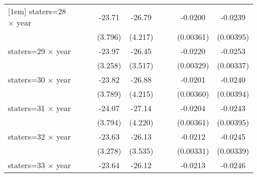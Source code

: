 {\begin{longtable}{l*{8}{c}}
[1em]
staters=28 $\times$ year&                     &                     &      -23.71\sym{***}&      -26.79\sym{***}&                     &                     &     -0.0200\sym{***}&     -0.0239\sym{***}\\
                    &                     &                     &     (3.796)         &     (4.217)         &                     &                     &   (0.00361)         &   (0.00395)         \\
[1em]
staters=29 $\times$ year&                     &                     &      -23.97\sym{***}&      -26.45\sym{***}&                     &                     &     -0.0220\sym{***}&     -0.0253\sym{***}\\
                    &                     &                     &     (3.258)         &     (3.517)         &                     &                     &   (0.00329)         &   (0.00337)         \\
[1em]
staters=30 $\times$ year&                     &                     &      -23.82\sym{***}&      -26.88\sym{***}&                     &                     &     -0.0201\sym{***}&     -0.0240\sym{***}\\
                    &                     &                     &     (3.789)         &     (4.215)         &                     &                     &   (0.00360)         &   (0.00394)         \\
[1em]
staters=31 $\times$ year&                     &                     &      -24.07\sym{***}&      -27.14\sym{***}&                     &                     &     -0.0204\sym{***}&     -0.0243\sym{***}\\
                    &                     &                     &     (3.794)         &     (4.220)         &                     &                     &   (0.00361)         &   (0.00395)         \\
[1em]
staters=32 $\times$ year&                     &                     &      -23.63\sym{***}&      -26.13\sym{***}&                     &                     &     -0.0212\sym{***}&     -0.0245\sym{***}\\
                    &                     &                     &     (3.278)         &     (3.535)         &                     &                     &   (0.00331)         &   (0.00339)         \\
[1em]
staters=33 $\times$ year&                     &                     &      -23.64\sym{***}&      -26.12\sym{***}&                     &                     &     -0.0213\sym{***}&     -0.0246\sym{***}\\

\end{longtable}}
